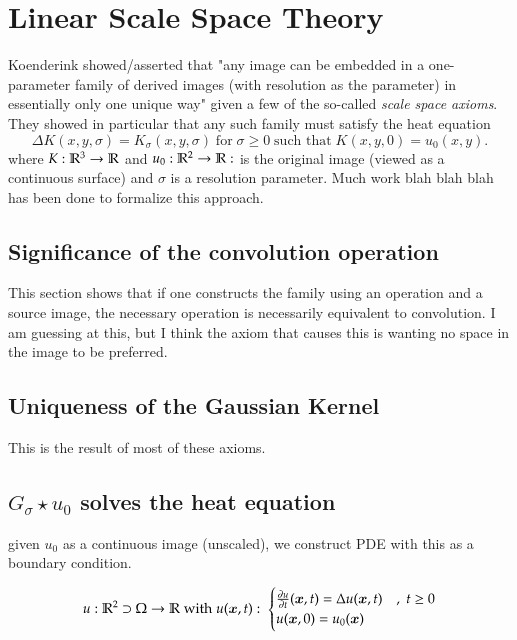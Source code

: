 \hrulefill
\section{Linear Scale Space Theory}
	Koenderink showed/asserted that "any image can be embedded in a one-parameter family of derived images (with resolution as the parameter) in essentially only one unique way" given a few of the so-called \textit{scale space axioms}. They showed in particular that any such family must satisfy the heat equation
	\begin{equation}
		\Delta K(x,y,\sigma) = K_\sigma (x,y,\sigma) 
		\;\text{for}\; \sigma \ge 0
		\;\text{such that}\; K(x,y, 0) = u_0(x,y).
		\end{equation}
		where $K: \mathbb{R}^3 \to \mathbb{R} $ and  $u_0: \mathbb{R}^2 \to \mathbb{R}: $ is the original image (viewed as a continuous surface) and $\sigma$ is a resolution parameter.
	Much work blah blah blah has been done to formalize this approach. 
	
\subsection{Significance of the convolution operation}
	This section shows that if one constructs the family using an operation and a source image, the necessary operation is necessarily equivalent to convolution. I am guessing at this, but I think the axiom that causes this is wanting no space in the image to be preferred.
\subsection{Uniqueness of the Gaussian Kernel}
	This is the result of most of these axioms.
	

\subsection{$G_\sigma \star u_0$ solves the heat equation}
	given $u_0$ as a continuous image (unscaled), we construct PDE with this as a boundary condition.
	
	\begin{equation}
		u: \mathbb{R}^2 \supset \Omega \to \mathbb{R} \; \textrm{with} \; u(\bm{x},t) : \;
			\begin{cases}
				\frac{\partial u}{\partial t} (\bm{x}, t) = \Delta u(\bm{x},t) & ,\; t \ge 0 \\
				u(\bm{x},0) = u_0(\bm{x}) 
			\end{cases}
		\end{equation}

